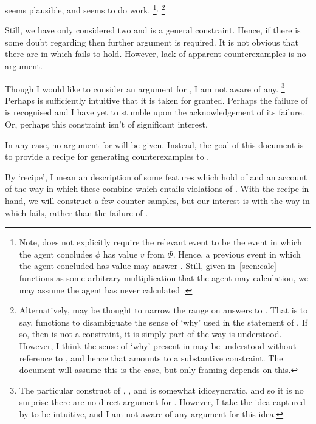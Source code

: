 \begin{note}
  \issueInclusion{} seems plausible, and seems to do work.%
  \footnote{
    Note, \qHow{} does not explicitly require the relevant event to be the event in which the agent concludes \(\phi\) has value \(v\) from \(\Phi\).
    Hence, a previous event in which the agent concluded \propM{\gistCalcEq{}} has value  may answer \qHow{}.
    Still, given \gistCalcEq{} in~\autoref{scen:calc} functions as some arbitrary multiplication that the agent may calculation, we may assume the agent has never calculated \gistCalcEq{}.
  }\(^{,}\)%
  \footnote{
    Alternatively, \issueInclusion{} may be thought to narrow the range on answers to \qWhy{}.
    That is to say, \issueInclusion{} functions to disambiguate the sense of `why' used in the statement of \qWhy{}.
    If so, then \issueInclusion{} is not a constraint, it is simply part of the way \qWhy{} is understood.
    However, I think the sense of `why' present in \qWhy{} may be understood without reference to \issueInclusion{}, and hence that \issueInclusion{} amounts to a substantive constraint.
    The document will assume this is the case, but only framing depends on this.
  }

  Still, we have only considered two  and \issueInclusion{} is a general constraint.
  Hence, if there is some doubt regarding \issueInclusion{} then further argument is required.
  It is not obvious that there are  in which \issueInclusion{} fails to hold.
  However, lack of apparent counterexamples is no argument.

  Though I would like to consider an argument for \issueInclusion{}, I am not aware of any.%
  \footnote{
    The particular construct of \qWhy{}, \qHow{}, and \issueInclusion{} is somewhat idiosyncratic, and so it is no surprise there are no direct argument for \issueInclusion{}.
    However, I take the idea captured by \issueInclusion{} to be intuitive, and I am not aware of any argument for this idea.
  }
  Perhaps \issueInclusion{} is sufficiently intuitive that it is taken for granted.
  Perhaps the failure of \issueInclusion{} is recognised and I have yet to stumble upon the acknowledgement of its failure.
  Or, perhaps this constraint isn't of significant interest.

  In any case, no argument for \issueInclusion{} will be given.
  Instead, the goal of this document is to provide a recipe for generating counterexamples to \issueInclusion{}.

  By `recipe', I mean an description of some features which hold of  and an account of the way in which these combine which entails violations of \issueInclusion{}.
  With the recipe in hand, we will construct a few counter samples, but our interest is with the way in which \issueInclusion{} fails, rather than the failure of \issueInclusion{}.


\end{note}
